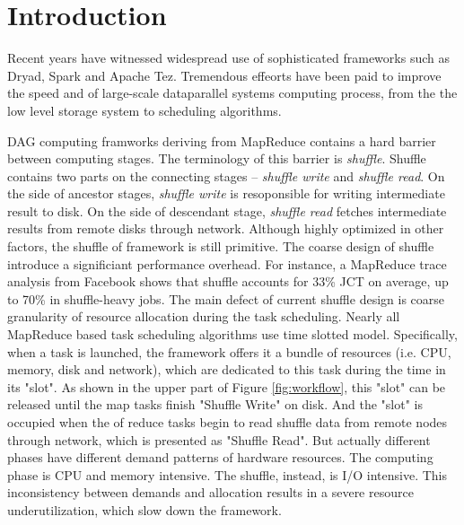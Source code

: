 \section{Introduction}

Recent years have witnessed widespread use of sophisticated frameworks such as Dryad\cite{dryad}, Spark\cite{spark} and Apache Tez\cite{tez}.
Tremendous effeorts have been paid to improve the speed and of large-scale dataparallel systems computing process, from the the low level storage system to scheduling algorithms.

DAG computing framworks deriving from MapReduce\cite{mapreduce} contains a hard barrier between computing stages. The terminology of this barrier is \textit{shuffle}. Shuffle contains two parts on the connecting stages -- \textit{shuffle write} and \textit{shuffle read}. On the side of ancestor stages, \textit{shuffle write} is resoponsible for writing intermediate result to disk. On the side of descendant stage, \textit{shuffle read} fetches intermediate results from remote disks through network. Although highly optimized in other factors, the shuffle of framework is still primitive.  The coarse design of shuffle introduce a significiant performance overhead.
For instance, a MapReduce trace analysis from Facebook shows that shuffle accounts for 33\% JCT on average, up to 70\% in shuffle-heavy jobs\cite{managing}.
The main defect of current shuffle design is coarse granularity of resource allocation during the task scheduling. Nearly all
MapReduce based task scheduling algorithms use time slotted model. Specifically, when a task is launched, the framework offers it a bundle of resources (i.e. CPU, memory, disk and network), which are dedicated to this task during the time in its "slot". As shown in the upper part of Figure \ref{fig:workflow}, this "slot" can be released until the map tasks finish "Shuffle Write" on disk. And the "slot" is occupied when the of reduce tasks begin to read shuffle data from remote nodes through network, which is presented as "Shuffle Read". But actually different phases have different demand patterns of hardware resources. The computing phase is CPU and memory intensive. The shuffle, instead, is I/O intensive. This inconsistency between demands and allocation results in a severe resource underutilization, which slow down the framework.

